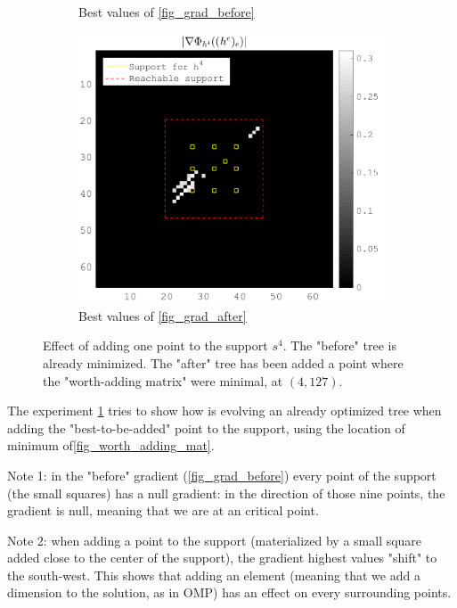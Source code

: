 \begin{figure}[!h]
\begin{subfigure}[b]{0.32\textwidth}
\caption{Best values of \ref{fig_grad_before}}
\end{subfigure}
\begin{subfigure}[b]{0.32\textwidth}\centering
\includegraphics[width=\textwidth]{figures/before_after/xp_128x128_sc2_angl1_K3_S3_node4after_partgrad4_bestvalues.png}
\caption{Best values of \ref{fig_grad_after}}
\end{subfigure}
\caption{Effect of adding one point to the support $s^4$. The "before" tree is already minimized. The "after" tree has been added a point where the "worth-adding matrix" were minimal, at $(4,127)$.} \label{fig_before_after_adding}
\end{figure}

The experiment \ref{fig_before_after_adding} tries to show how is evolving an already optimized tree when adding the "best-to-be-added" point to the support, using the location of minimum of\ref{fig_worth_adding_mat}. 

Note 1: in the "before" gradient (\cref{fig_grad_before}) every point of the support (the small squares) has a null gradient: in the direction of those nine points, the gradient is null, meaning that we are at an critical point. 

Note 2: when adding a point to the support (materialized by a small square added close to the center of the support), the gradient highest values "shift" to the south-west. This shows that adding an element (meaning that we add a dimension to the solution, as in OMP) has an effect on every surrounding points.




